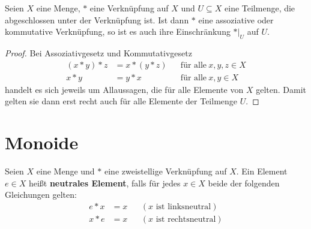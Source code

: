 \begin{satz} \label{verknuepfeigstabil}
    Seien $X$ eine Menge, $*$ eine Verknüpfung auf $X$ und $U\subseteq X$ eine Teilmenge, die abgeschlossen unter der Verknüpfung ist. Ist dann $*$ eine assoziative oder kommutative Verknüpfung, so ist es auch ihre Einschränkung $*\vert_U$ auf $U$.
\end{satz}
\begin{proof}
    Bei Assoziativgesetz und Kommutativgesetz
    \begin{align*}
        (x*y)*z & = x*(y*z) && \text{für alle}\ x,y,z\in X \\
        x*y & = y*x && \text{für alle}\ x,y\in X
    \end{align*}
    handelt es sich jeweils um Allaussagen, die für alle Elemente von $X$ gelten. Damit gelten sie dann erst recht auch für alle Elemente der Teilmenge $U$.
\end{proof}





\section{Monoide}


\begin{defin} \label{def:neutrales} 
    Seien $X$ eine Menge und $*$ eine zweistellige Verknüpfung auf $X$. Ein Element $e\in X$ heißt \textbf{neutrales Element}, falls für jedes $x\in X$ beide der folgenden Gleichungen gelten:
    \begin{align*}
        e*x & = x && (\text{$x$ ist linksneutral}) \\
        x*e & = x && (\text{$x$ ist rechtsneutral})
    \end{align*}
\end{defin}


